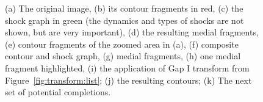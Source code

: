 \begin{figure}[ht]
      \caption{\FigureFont (a) The original image, (b) its  contour fragments
in red,
(c) the shock graph in green (the dynamics and types of shocks are not shown,
but are very important), (d) the resulting medial fragments, (e) contour fragments of the
zoomed area in (a), (f)  composite contour and shock graph, (g) 
medial fragments, (h) one medial fragment highlighted, (i) the application of Gap I transform from Figure~\ref{fig:transform:list}; (j) the resulting contours; (k) The next set of potential
completions.}
   \label{fig:frag:definition}
\end{figure}
  
% 
%    
% 
% 
% 
% 



